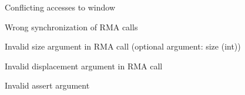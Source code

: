 \begin{description}
\item[ ]Conflicting
    accesses to window 
\item[ ]Wrong synchronization
of RMA calls 
\item[ ]Invalid size argument in
RMA call (optional 
  argument: size (int))
\item[ ]Invalid displacement
  argument in RMA call 
\item[ ]Invalid assert argument
\end{description}

%



